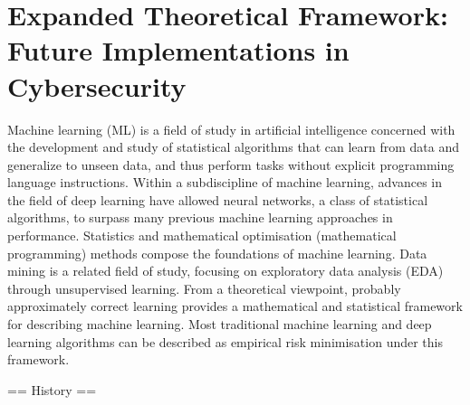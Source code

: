 \section{Expanded Theoretical Framework: Future Implementations in Cybersecurity}
Machine learning (ML) is a field of study in artificial intelligence concerned with the development and study of statistical algorithms that can learn from data and generalize to unseen data, and thus perform tasks without explicit programming language instructions. Within a subdiscipline of machine learning, advances in the field of deep learning have allowed neural networks, a class of statistical algorithms, to surpass many previous machine learning approaches in performance.
Statistics and mathematical optimisation (mathematical programming) methods compose the foundations of machine learning. Data mining is a related field of study, focusing on exploratory data analysis (EDA) through unsupervised learning.
From a theoretical viewpoint, probably approximately correct learning provides a mathematical and statistical framework for describing machine learning. Most traditional machine learning and deep learning algorithms can be described as empirical risk minimisation under this framework.


== History ==

